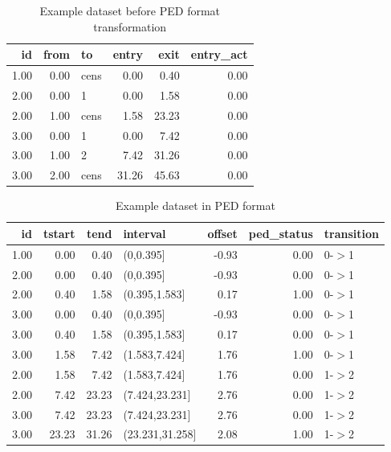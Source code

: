 \begin{table}[ht]
\centering
\begin{tabular}{rrlrrr}
  \toprule
id & from & to & entry & exit & entry\_act \\ 
  \midrule
1.00 & 0.00 & cens & 0.00 & 0.40 & 0.00 \\ 
  2.00 & 0.00 & 1 & 0.00 & 1.58 & 0.00 \\ 
  2.00 & 1.00 & cens & 1.58 & 23.23 & 0.00 \\ 
  3.00 & 0.00 & 1 & 0.00 & 7.42 & 0.00 \\ 
  3.00 & 1.00 & 2 & 7.42 & 31.26 & 0.00 \\ 
  3.00 & 2.00 & cens & 31.26 & 45.63 & 0.00 \\ 
   \bottomrule
\end{tabular}
\caption{Example dataset before PED format transformation} 
\end{table}
\begin{table}[ht]
\centering
\begin{tabular}{rrrlrrl}
  \toprule
id & tstart & tend & interval & offset & ped\_status & transition \\ 
  \midrule
1.00 & 0.00 & 0.40 & (0,0.395] & -0.93 & 0.00 & 0-$>$1 \\ 
  2.00 & 0.00 & 0.40 & (0,0.395] & -0.93 & 0.00 & 0-$>$1 \\ 
  2.00 & 0.40 & 1.58 & (0.395,1.583] & 0.17 & 1.00 & 0-$>$1 \\ 
  3.00 & 0.00 & 0.40 & (0,0.395] & -0.93 & 0.00 & 0-$>$1 \\ 
  3.00 & 0.40 & 1.58 & (0.395,1.583] & 0.17 & 0.00 & 0-$>$1 \\ 
  3.00 & 1.58 & 7.42 & (1.583,7.424] & 1.76 & 1.00 & 0-$>$1 \\ 
  2.00 & 1.58 & 7.42 & (1.583,7.424] & 1.76 & 0.00 & 1-$>$2 \\ 
  2.00 & 7.42 & 23.23 & (7.424,23.231] & 2.76 & 0.00 & 1-$>$2 \\ 
  3.00 & 7.42 & 23.23 & (7.424,23.231] & 2.76 & 0.00 & 1-$>$2 \\ 
  3.00 & 23.23 & 31.26 & (23.231,31.258] & 2.08 & 1.00 & 1-$>$2 \\ 
   \bottomrule
\end{tabular}
\caption{Example dataset in PED format} 
\end{table}
